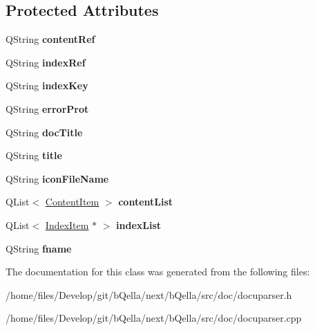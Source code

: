 \subsection*{Protected Attributes}
\begin{DoxyCompactItemize}
\item 
\hypertarget{classDocuParser_af6ac3c4ed81cfe669907451706156f01}{
QString {\bfseries contentRef}}
\label{classDocuParser_af6ac3c4ed81cfe669907451706156f01}

\item 
\hypertarget{classDocuParser_a0b7124f02efcaef6df8fb787da2d61a7}{
QString {\bfseries indexRef}}
\label{classDocuParser_a0b7124f02efcaef6df8fb787da2d61a7}

\item 
\hypertarget{classDocuParser_aef57a8114ee0ce2b7993206bfbb8efb0}{
QString {\bfseries indexKey}}
\label{classDocuParser_aef57a8114ee0ce2b7993206bfbb8efb0}

\item 
\hypertarget{classDocuParser_af612ec96f6295fdfa712c10071e3d200}{
QString {\bfseries errorProt}}
\label{classDocuParser_af612ec96f6295fdfa712c10071e3d200}

\item 
\hypertarget{classDocuParser_ae31e9b183e002d8ae8fe41307f75ac9f}{
QString {\bfseries docTitle}}
\label{classDocuParser_ae31e9b183e002d8ae8fe41307f75ac9f}

\item 
\hypertarget{classDocuParser_a38c1ea49c18ee58523d65d6ceb58fdd6}{
QString {\bfseries title}}
\label{classDocuParser_a38c1ea49c18ee58523d65d6ceb58fdd6}

\item 
\hypertarget{classDocuParser_a226730b9dd5c45bfa6ad668b80f2f519}{
QString {\bfseries iconFileName}}
\label{classDocuParser_a226730b9dd5c45bfa6ad668b80f2f519}

\item 
\hypertarget{classDocuParser_aaf96915b8dfae6972df0c92b490df6d5}{
QList$<$ \hyperlink{structContentItem}{ContentItem} $>$ {\bfseries contentList}}
\label{classDocuParser_aaf96915b8dfae6972df0c92b490df6d5}

\item 
\hypertarget{classDocuParser_a67b3d4db1cd9787ecc819a010a3a0fe9}{
QList$<$ \hyperlink{structIndexItem}{IndexItem} $\ast$ $>$ {\bfseries indexList}}
\label{classDocuParser_a67b3d4db1cd9787ecc819a010a3a0fe9}

\item 
\hypertarget{classDocuParser_aea62d1745e59aa3bd2852077e2f48c27}{
QString {\bfseries fname}}
\label{classDocuParser_aea62d1745e59aa3bd2852077e2f48c27}

\end{DoxyCompactItemize}


The documentation for this class was generated from the following files:\begin{DoxyCompactItemize}
\item 
/home/files/Develop/git/bQella/next/bQella/src/doc/docuparser.h\item 
/home/files/Develop/git/bQella/next/bQella/src/doc/docuparser.cpp\end{DoxyCompactItemize}
